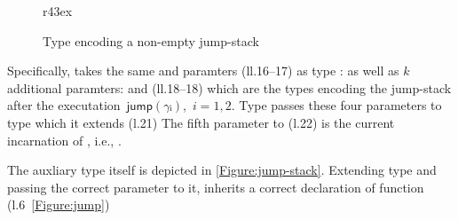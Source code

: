 \begin{wrapfigure}[10]r{43ex}
  \caption{\label{Figure:jump-stack-push} Type  encoding a non-empty jump-stack}
\end{wrapfigure}

Specifically,  takes 
the same  and  paramters (ll.16--17) as type :
  as well as $k$ additional paramters:
   and  (ll.18--18)
which are the types encoding the jump-stack
  after the executation~$\textsf{jump}(γᵢ)$,~$i=1,2$.
Type  passes these four parameters 
to type  which it extends (l.21)
The fifth parameter to  (l.22) is the current incarnation of , i.e., 
  .

The auxliary type  itself is depicted in \cref{Figure:jump-stack}.
Extending type  and passing the correct  parameter to it, 
 inherits a correct declaration of function  (l.6~\cref{Figure:jump}) 

